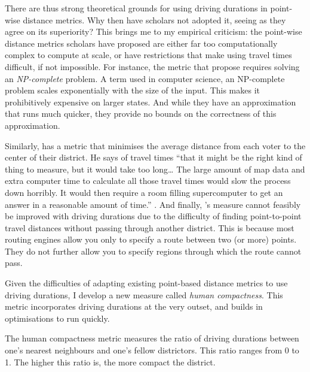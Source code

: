 \documentclass[]{article}
\begin{document}
There are thus strong theoretical grounds for using driving durations in
point-wise distance metrics. Why then have scholars not adopted it,
seeing as they agree on its superiority? This brings me to my empirical
criticism: the point-wise distance metrics scholars have proposed are
either far too computationally complex to compute at scale, or have
restrictions that make using travel times difficult, if not impossible.
For instance, the metric that \citet{fh2011} propose requires solving an
\emph{NP-complete} problem. A term used in computer science, an
NP-complete problem scales exponentially with the size of the input.
This makes it prohibitively expensive on larger states. And while they
have an approximation that runs much quicker, they provide no bounds on
the correctness of this approximation.

Similarly, \citeauthor{olson2010} has a metric that minimises the
average distance from each voter to the center of their district. He
says of travel times ``that it might be the right kind of thing to
measure, but it would take too long\ldots{} The large amount of map data
and extra computer time to calculate all those travel times would slow
the process down horribly. It would then require a room filling
supercomputer to get an answer in a reasonable amount of time.''
\citep{olson2010}. And finally, \citeauthor{cm2010}'s measure cannot
feasibly be improved with driving durations due to the difficulty of
finding point-to-point travel distances without passing through another
district. This is because most routing engines allow you only to specify
a route between two (or more) points. They do not further allow you to
specify regions through which the route cannot pass.

Given the difficulties of adapting existing point-based distance metrics
to use driving durations, I develop a new measure called \emph{human
compactness}. This metric incorporates driving durations at the very
outset, and builds in optimisations to run quickly.

The human compactness metric measures the ratio of driving durations
between one's nearest neighbours and one's fellow districtors. This
ratio ranges from 0 to 1. The higher this ratio is, the more compact the
district.
\end{document}
